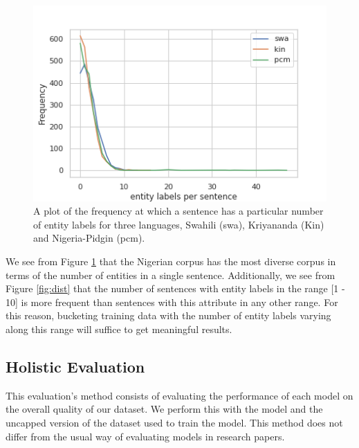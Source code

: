 \documentclass[11pt,a4paper]{article}
\begin{document}
\begin{figure}
    \centering
    \includegraphics[width=\columnwidth]{images/evlution.png}
    \caption{A plot of the frequency at which a sentence has a particular number of entity labels for three languages, Swahili (swa), Kriyananda (Kin) and Nigeria-Pidgin (pcm).}
    \label{fig:evolution}
\end{figure}

We see from Figure \ref{fig:evolution} that the Nigerian corpus has the most diverse corpus in terms of the number of entities in a single sentence. Additionally, we see from Figure \ref{fig:dist} that the number of sentences with entity labels in the range [1 - 10] is more frequent than sentences with this attribute in any other range. For this reason, bucketing training data with the number of entity labels varying along this range will suffice to get meaningful results.

\subsection{Holistic Evaluation}
This evaluation's method consists of evaluating the performance of each model on the overall quality of our dataset. We perform this with the model and the uncapped version of the dataset used to train the model. This method does not differ from the usual way of evaluating models in research papers.



\end{document}
